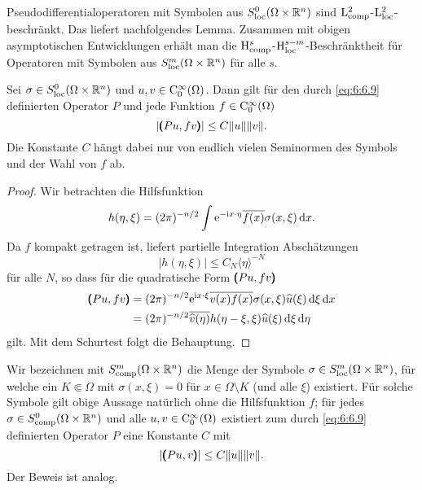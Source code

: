 Pseudodifferentialoperatoren mit Symbolen aus $S^0_{\rm loc}(\Omega\times\mathbb R^n)$ sind $\mathrm L^2_{\rm comp}$-$\mathrm L^2_{\rm loc}$-beschränkt. Das liefert nachfolgendes Lemma. Zusammen mit obigen asymptotischen Entwicklungen erhält man die $\mathrm H^s_{\rm comp}$-$\mathrm H^{s-m}_{\rm loc}$-Beschränktheit für Operatoren mit Symbolen aus $S^m_{\rm loc}(\Omega\times\mathbb R^n)$ für alle $s$.
\begin{lem}
Sei $\sigma\in S^0_{\rm loc}(\Omega\times\mathbb R^n)$ und $u,v\in\mathrm C_0^\infty(\Omega)$. Dann gilt für den durch \eqref{eq:6:6.9} definierten Operator $P$
und jede Funktion $f\in\mathrm C_0^\infty(\Omega)$
\begin{equation}
   | \pmb(Pu,f v\pmb) | \le C \|u\|\|v\|.
\end{equation}
Die Konstante $C$ hängt dabei nur von endlich vielen Seminormen des Symbols und der Wahl von $f$ ab.
\end{lem}
\begin{proof}
Wir betrachten die Hilfsfunktion
\begin{equation}\label{eq:6:h-def}
  h(\eta,\xi) =  (2\pi)^{-n/2} \int \mathrm e^{-\mathrm i x\cdot\eta} \overline{f(x)} \sigma(x,\xi) \,\mathrm d x.
\end{equation}
Da $f$ kompakt getragen ist, liefert partielle Integration Abschätzungen
\begin{equation}
   |h(\eta,\xi)|  \le C_N \langle\eta\rangle^{-N}
\end{equation}
für alle $N$, so dass für die quadratische Form $\pmb(Pu,fv\pmb)$
\begin{equation}
\begin{split}
   \pmb(Pu,fv\pmb) &= (2\pi)^{-n/2} \relax \mathrm e^{\mathrm i x\cdot \xi}\overline{ v(x) f(x)} \sigma(x,\xi) \widehat u(\xi)\,\mathrm d\xi\,\mathrm d x\\
   &= (2\pi)^{-n/2} \relax \overline{ \widehat v(\eta) }h(\eta-\xi,\xi) \widehat u(\xi)\,\mathrm d\xi\,\mathrm d\eta
\end{split}
\end{equation}
gilt. Mit dem Schurtest folgt die Behauptung.
\end{proof}

Wir bezeichnen mit $S^m_{\rm comp}(\Omega\times\mathbb R^n)$ die Menge der Symbole $\sigma\in S^m_{\rm loc}(\Omega\times\mathbb R^n)$, für welche ein $K\Subset\Omega$ mit $\sigma(x,\xi)=0$ für $x\in\Omega\setminus K$ (und alle $\xi$) existiert. Für solche Symbole gilt obige Aussage natürlich ohne die Hilfsfunktion $f$; für jedes $\sigma\in S^0_{\rm comp}(\Omega\times\mathbb R^n)$ und alle $u,v \in\mathrm C_0^\infty(\Omega)$ existiert zum durch \eqref{eq:6:6.9} definierten Operator $P$ eine Konstante $C$ mit
\begin{equation}
   | \pmb(Pu,v\pmb) | \le C \|u\|\|v\|.
\end{equation}
Der Beweis ist analog.


